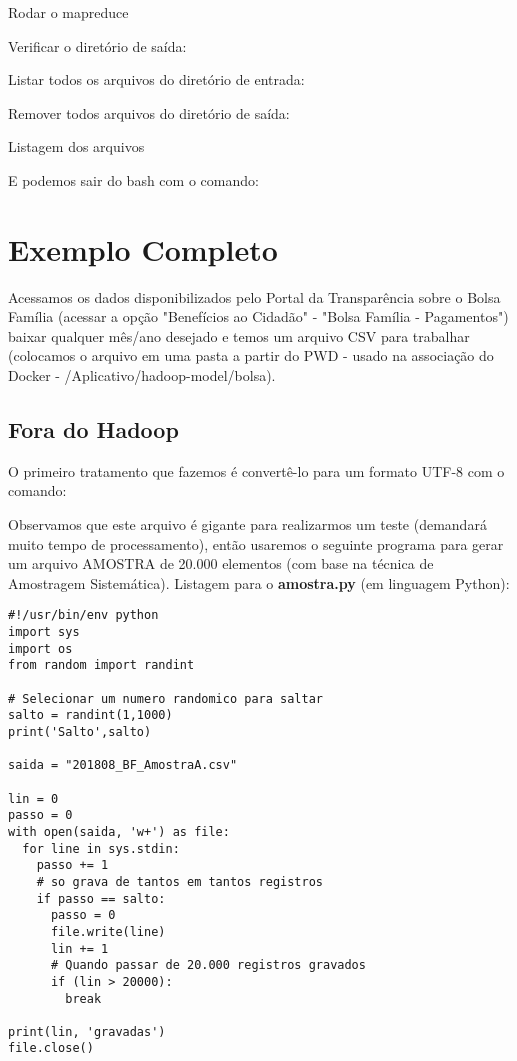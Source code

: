 \documentclass[a4paper,11pt]{article}
\begin{document}
Rodar o mapreduce \\

Verificar o diretório de saída: \\

Listar todos os arquivos do diretório de entrada: \\

Remover todos arquivos do diretório de saída: \\

Listagem dos arquivos \\

E podemos sair do bash com o comando: \\

\section{Exemplo Completo}
Acessamos os dados disponibilizados pelo Portal da Transparência\cite{portaltransp} sobre o Bolsa Família (acessar a opção "Benefícios ao Cidadão" - "Bolsa Família - Pagamentos") baixar qualquer mês/ano desejado e temos um arquivo CSV para trabalhar (colocamos o arquivo em uma pasta a partir do PWD - usado na associação do Docker - /Aplicativo/hadoop-model/bolsa).

\subsection{Fora do Hadoop}
O primeiro tratamento que fazemos é convertê-lo para um formato UTF-8 com o comando: \\

Observamos que este arquivo é gigante para realizarmos um teste (demandará muito tempo de processamento), então usaremos o seguinte programa para gerar um arquivo AMOSTRA de 20.000 elementos (com base na técnica de Amostragem Sistemática). Listagem para o \textbf{amostra.py} (em linguagem Python):
\begin{lstlisting}[]
#!/usr/bin/env python
import sys
import os
from random import randint

# Selecionar um numero randomico para saltar
salto = randint(1,1000)
print('Salto',salto)

saida = "201808_BF_AmostraA.csv"

lin = 0
passo = 0
with open(saida, 'w+') as file:
  for line in sys.stdin:
    passo += 1
    # so grava de tantos em tantos registros
    if passo == salto:
      passo = 0
      file.write(line)            
      lin += 1
      # Quando passar de 20.000 registros gravados
      if (lin > 20000):
        break

print(lin, 'gravadas')
file.close()
\end{lstlisting}
\end{document}
